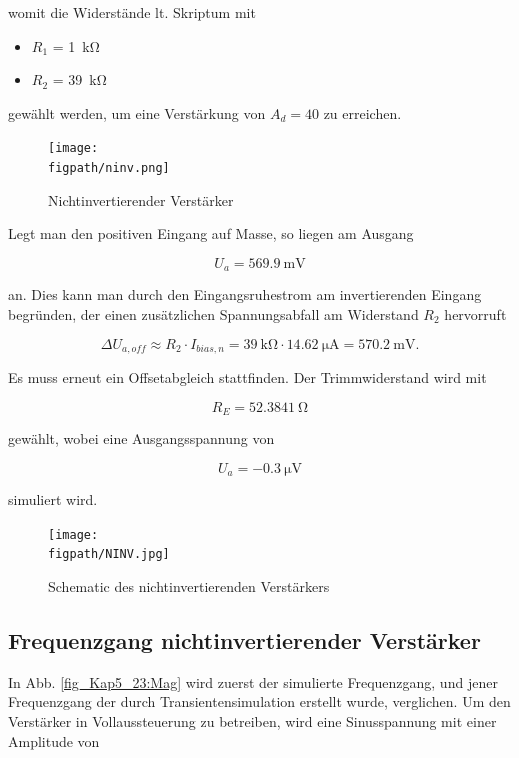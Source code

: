 womit die Widerstände lt. Skriptum mit

\begin{itemize}
    \item $R_1$ = \SI{1}{\kilo\ohm}
    \item $R_2$ = \SI{39}{\kilo\ohm}
\end{itemize}

gewählt werden, um eine Verstärkung von $A_d = 40$ zu erreichen.

\begin{figure}[H]
    \centering
    \texttt{[image: \\figpath/ninv.png]}
    \caption{Nichtinvertierender Verstärker}
    \label{fig_Kap5_22:ESB}
\end{figure}

Legt man den positiven Eingang auf Masse, so liegen am Ausgang

\begin{equation*}
    U_{a} = \SI{569,9}{\milli\volt}
\end{equation*}

an. Dies kann man durch den Eingangsruhestrom am invertierenden Eingang begründen, der einen zusätzlichen Spannungsabfall am Widerstand $R_2$ hervorruft

\begin{equation}
    \Delta U_{a,off} \approx R_2 \cdot I_{bias,n} = \SI{39}{\kilo\ohm} \cdot \SI{14,62}{\micro\ampere} = \SI{570,2}{\milli\volt} .
\end{equation}

Es muss erneut ein Offsetabgleich stattfinden. Der Trimmwiderstand wird mit 

\begin{equation*}
    R_E = \SI{52.3841}{\ohm}
\end{equation*}

gewählt, wobei eine Ausgangsspannung von

\begin{equation*}
    U_a = -\SI{0,3}{\micro\volt}
\end{equation*}

simuliert wird.

\begin{figure}[H]
    \centering
    \texttt{[image: \\figpath/NINV.jpg]}
    \caption{Schematic des nichtinvertierenden Verstärkers}
    \label{fig_Kap5_23:SpiceSchematic}
\end{figure}

\subsection{Frequenzgang nichtinvertierender Verstärker}
In Abb. \ref{fig_Kap5_23:Mag} wird zuerst der simulierte Frequenzgang, und jener Frequenzgang der durch Transientensimulation erstellt wurde, verglichen. Um den Verstärker in Vollaussteuerung zu betreiben, wird eine Sinusspannung mit einer Amplitude von 

